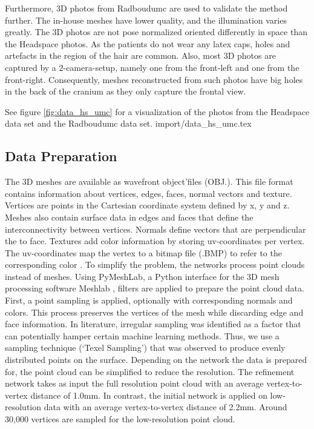 \documentclass[class=article, crop=false]{standalone}
\begin{document}
Furthermore, 3D photos from Radboudumc are used to validate the method further. The in-house meshes have lower quality, and the illumination varies greatly. The 3D photos are not pose normalized oriented differently in space than the Headspace photos. As the patients do not wear any latex caps, holes and artefacts in the region of the hair are common. Also, most 3D photos are captured by a 2-camera-setup, namely one from the front-left and one from the front-right. Consequently, meshes reconstructed from such photos have big holes in the back of the cranium as they only capture the frontal view.

See figure \ref{fig:data_hs_umc} for a visualization of the photos from the Headspace data set and the Radboudumc data set.
{import/data_hs_umc.tex}

\subsection{Data Preparation}\label{sec_data_preparation}
The 3D meshes are available as wavefront object’files (OBJ.). This file format contains information about vertices, edges, faces, normal vectors and texture.
Vertices are points in the Cartesian coordinate system defined by x, y and z. Meshes also contain surface data in edges and faces that define the interconnectivity between vertices. Normals define vectors that are perpendicular the to face. Textures add color information by storing uv-coordinates per vertex. The uv-coordinates map the vertex to a bitmap file (.BMP) to refer to the corresponding color  \cite{Jong}.
To simplify the problem, the networks process point clouds instead of meshes. Using PyMeshLab, a Python interface for the 3D mesh processing software Meshlab \cite{meshlab}, filters are applied to prepare the point cloud data. First, a point sampling is applied, optionally with corresponding normals and colors. This process preserves the vertices of the mesh while discarding edge and face information. In literature, irregular sampling was identified as a factor that can potentially hamper certain machine learning methods. Thus, we use a sampling technique (‘Texel Sampling’) that was observed to produce evenly distributed points on the surface. Depending on the network the data is prepared for, the point cloud can be simplified to reduce the resolution. The refinement network takes as input the full resolution point cloud with an average vertex-to-vertex distance of 1.0mm. In contrast, the initial network is applied on low-resolution data with an average vertex-to-vertex distance of 2.2mm. Around 30,000 vertices are sampled for the low-resolution point cloud.
\end{document}
